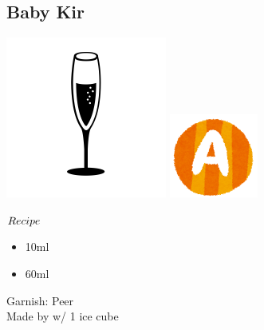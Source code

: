 \subsection{Baby Kir}
\vspace{-7.6mm}
\hspace{30mm}
\includegraphics[scale=.08]{cocktail_glass_flute.png}
\includegraphics[scale=.12]{capital_a.png}
\vspace{2.5mm}
\begin{itembox}[l]{\boldmath $Recipe$}
\begin{itemize}
\setlength{\parskip}{0cm}
\setlength{\itemsep}{0cm}
\item \cc 10ml
\item \gj 60ml
\end{itemize}
\vspace{-4mm}
Garnish: \lemon Peer\\
Made by \build w/ 1 ice cube
\end{itembox}

